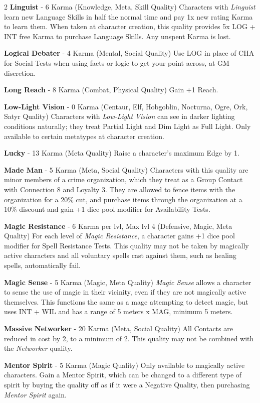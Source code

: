 \documentclass[
  oneside]{article}
\begin{document}
\begin{multicols}{2}
\textbf{Linguist} - 6 Karma (Knowledge, Meta,
Skill Quality) Characters with \emph{Linguist}
learn new Language Skills in half the normal time
and pay 1x new rating Karma to learn them. When
taken at character creation, this quality provides
5x LOG + INT free Karma to purchase Language
Skills. Any unspent Karma is lost.

\textbf{Logical Debater} - 4 Karma (Mental, Social
Quality) Use LOG in place of CHA for Social Tests
when using facts or logic to get your point
across, at GM discretion.

\textbf{Long Reach} - 8 Karma (Combat, Physical
Quality) Gain +1 Reach.

\textbf{Low-Light Vision} - 0 Karma (Centaur, Elf,
Hobgoblin, Nocturna, Ogre, Ork, Satyr Quality)
Characters with \emph{Low-Light Vision} can see in
darker lighting conditions naturally; they treat
Partial Light and Dim Light as Full Light. Only
available to certain metatypes at character
creation.

\textbf{Lucky} - 13 Karma (Meta Quality) Raise a
character's maximum Edge by 1.

\textbf{Made Man} - 5 Karma (Meta, Social Quality)
Characters with this quality are minor members of
a crime organization, which they treat as a Group
Contact with Connection 8 and Loyalty 3. They are
allowed to fence items with the organization for a
20\% cut, and purchase items through the
organization at a 10\% discount and gain +1 dice
pool modifier for Availability Tests.

\textbf{Magic Resistance} - 6 Karma per lvl, Max
lvl 4 (Defensive, Magic, Meta Quality) For each
level of \emph{Magic Resistance}, a character
gains +1 dice pool modifier for Spell Resistance
Tests. This quality may not be taken by magically
active characters and all voluntary spells cast
against them, such as healing spells,
automatically fail.

\textbf{Magic Sense} - 5 Karma (Magic, Meta
Quality) \emph{Magic Sense} allows a character to
sense the use of magic in their vicinity, even if
they are not magically active themselves. This
functions the same as a mage attempting to detect
magic, but uses INT + WIL and has a range of 5
meters x MAG, minimum 5 meters.

\textbf{Massive Networker} - 20 Karma (Meta,
Social Quality) All Contacts are reduced in cost
by 2, to a minimum of 2. This quality may not be
combined with the \emph{Networker} quality.

\textbf{Mentor Spirit} - 5 Karma (Magic Quality)
Only available to magically active characters.
Gain a Mentor Spirit, which can be changed to a
different type of spirit by buying the quality off
as if it were a Negative Quality, then purchasing
\emph{Mentor Spirit} again.


\end{multicols}
\end{document}
